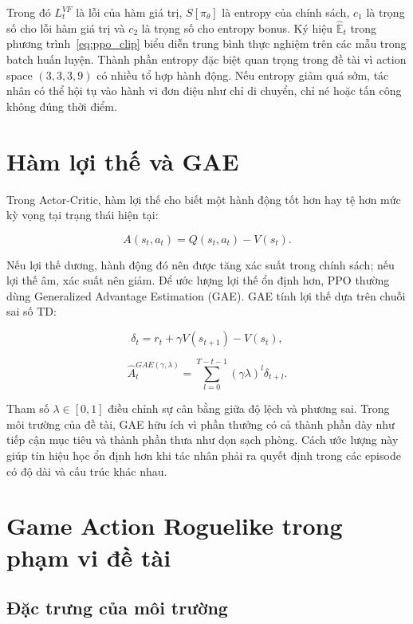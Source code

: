 Trong đó $L_t^{VF}$ là lỗi của hàm giá trị, $S[\pi_\theta]$ là entropy của chính sách, $c_1$ là trọng số cho lỗi hàm giá trị và $c_2$ là trọng số cho entropy bonus. Ký hiệu $\hat{\mathbb{E}}_t$ trong phương trình~\ref{eq:ppo_clip} biểu diễn trung bình thực nghiệm trên các mẫu trong batch huấn luyện. Thành phần entropy đặc biệt quan trọng trong đề tài vì action space $(3,3,3,9)$ có nhiều tổ hợp hành động. Nếu entropy giảm quá sớm, tác nhân có thể hội tụ vào hành vi đơn điệu như chỉ di chuyển, chỉ né hoặc tấn công không đúng thời điểm.

\section{Hàm lợi thế và GAE}

Trong Actor-Critic, hàm lợi thế cho biết một hành động tốt hơn hay tệ hơn mức kỳ vọng tại trạng thái hiện tại:

\begin{equation}
    A(s_t,a_t) = Q(s_t,a_t) - V(s_t).
\end{equation}

Nếu lợi thế dương, hành động đó nên được tăng xác suất trong chính sách; nếu lợi thế âm, xác suất nên giảm. Để ước lượng lợi thế ổn định hơn, PPO thường dùng Generalized Advantage Estimation (GAE). GAE tính lợi thế dựa trên chuỗi sai số TD:

\begin{equation}
    \delta_t = r_t + \gamma V(s_{t+1}) - V(s_t),
\end{equation}

\begin{equation} \label{eq:gae_formula}
    \hat{A}_t^{GAE(\gamma,\lambda)}
    =
    \sum_{l=0}^{T-t-1}(\gamma\lambda)^l \delta_{t+l}.
\end{equation}

Tham số $\lambda \in [0,1]$ điều chỉnh sự cân bằng giữa độ lệch và phương sai. Trong môi trường của đề tài, GAE hữu ích vì phần thưởng có cả thành phần dày như tiếp cận mục tiêu và thành phần thưa như dọn sạch phòng. Cách ước lượng này giúp tín hiệu học ổn định hơn khi tác nhân phải ra quyết định trong các episode có độ dài và cấu trúc khác nhau.

\section{Game Action Roguelike trong phạm vi đề tài}
\subsection{Đặc trưng của môi trường}

